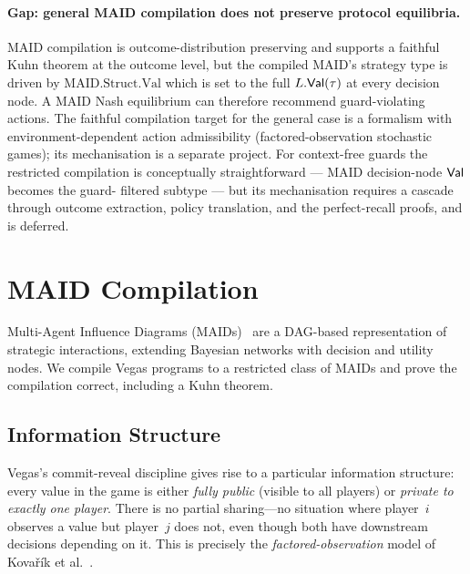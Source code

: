 \documentclass[11pt]{article}
\begin{document}
\paragraph{Gap: general MAID compilation does not preserve protocol
equilibria.}
MAID compilation is outcome-distribution preserving and supports a
faithful Kuhn theorem at the outcome level, but the compiled MAID's
strategy type is driven by $\mathrm{MAID.Struct.Val}$ which is set to
the full $L.\mathsf{Val}(\tau)$ at every decision node. A MAID Nash
equilibrium can therefore recommend guard-violating actions. The
faithful compilation target for the general case is a formalism with
environment-dependent action admissibility (factored-observation
stochastic games); its mechanisation is a separate project. For
context-free guards the restricted compilation is conceptually
straightforward --- MAID decision-node $\mathsf{Val}$ becomes the guard-
filtered subtype --- but its mechanisation requires a cascade through
outcome extraction, policy translation, and the perfect-recall
proofs, and is deferred.


\section{MAID Compilation}\label{sec:maid}

Multi-Agent Influence Diagrams (MAIDs)~\cite{koller2003multi} are a
DAG-based representation of strategic interactions, extending Bayesian
networks with decision and utility nodes. We compile Vegas programs to a
restricted class of MAIDs and prove the compilation correct, including a
Kuhn theorem.

\subsection{Information Structure}\label{sec:maid-info}

Vegas's commit-reveal discipline gives rise to a particular information
structure: every value in the game is either \emph{fully public} (visible to
all players) or \emph{private to exactly one player}. There is no partial
sharing---no situation where player~$i$ observes a value but player~$j$ does
not, even though both have downstream decisions depending on it. This is
precisely the \emph{factored-observation} model of
Kova\v{r}\'ik et al.~\cite{kovarik2019rethinking}.
\end{document}
